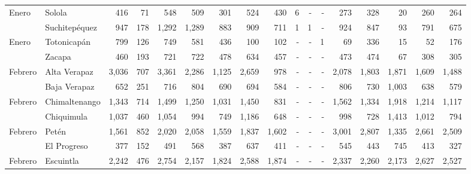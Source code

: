\begin{landscape}
\begin{center}
\begin{longtable}{llrrrrrrrrrrrrrrr}
			\multicolumn{1}{l}{	\footnotesize	 Enero 	}&	 Solola 	&	 416 	&	 71 	&	 548 	&	 509 	&	 301 	&	 524 	&	 430 	&	 6 	&	 -   	&	 -   	&	 273 	&	 328 	&	 20 	&	 260 	&	 264 	\\
			\rowcolor{color1!5!white}\multicolumn{1}{l}{	\footnotesize	 Enero 	}&	 Suchitepéquez 	&	 947 	&	 178 	&	 1,292 	&	 1,289 	&	 883 	&	 909 	&	 711 	&	 1 	&	 1 	&	 -   	&	 924 	&	 847 	&	 93 	&	 791 	&	 675 	\\
			\multicolumn{1}{l}{	\footnotesize	 Enero 	}&	 Totonicapán 	&	 799 	&	 126 	&	 749 	&	 581 	&	 436 	&	 100 	&	 102 	&	 -   	&	 -   	&	 1 	&	 69 	&	 336 	&	 15 	&	 52 	&	 176 	\\
			\rowcolor{color1!5!white}\multicolumn{1}{l}{	\footnotesize	 Enero 	}&	 Zacapa 	&	 460 	&	 193 	&	 721 	&	 722 	&	 478 	&	 634 	&	 457 	&	 -   	&	 -   	&	 -   	&	 473 	&	 474 	&	 67 	&	 308 	&	 305 	\\
			\multicolumn{1}{l}{	\footnotesize	 Febrero 	}&	 Alta Verapaz 	&	 3,036 	&	 707 	&	 3,361 	&	 2,286 	&	 1,125 	&	 2,659 	&	 978 	&	 -   	&	 -   	&	 -   	&	 2,078 	&	 1,803 	&	 1,871 	&	 1,609 	&	 1,488 	\\
			\rowcolor{color1!5!white}\multicolumn{1}{l}{	\footnotesize	 Febrero 	}&	 Baja Verapaz 	&	 652 	&	 251 	&	 716 	&	 804 	&	 690 	&	 694 	&	 584 	&	 -   	&	 -   	&	 -   	&	 806 	&	 730 	&	 1,003 	&	 638 	&	 579 	\\
			\multicolumn{1}{l}{	\footnotesize	 Febrero 	}&	 Chimaltenango 	&	 1,343 	&	 714 	&	 1,499 	&	 1,250 	&	 1,031 	&	 1,450 	&	 831 	&	 -   	&	 -   	&	 -   	&	 1,562 	&	 1,334 	&	 1,918 	&	 1,214 	&	 1,117 	\\
			\rowcolor{color1!5!white}\multicolumn{1}{l}{	\footnotesize	 Febrero 	}&	 Chiquimula 	&	 1,037 	&	 460 	&	 1,054 	&	 994 	&	 749 	&	 1,186 	&	 648 	&	 -   	&	 -   	&	 -   	&	 998 	&	 728 	&	 1,413 	&	 1,012 	&	 794 	\\
			\multicolumn{1}{l}{	\footnotesize	 Febrero 	}&	 Petén 	&	 1,561 	&	 852 	&	 2,020 	&	 2,058 	&	 1,559 	&	 1,837 	&	 1,602 	&	 -   	&	 -   	&	 -   	&	 3,001 	&	 2,807 	&	 1,335 	&	 2,661 	&	 2,509 	\\
			\rowcolor{color1!5!white}\multicolumn{1}{l}{	\footnotesize	 Febrero 	}&	 El Progreso 	&	 377 	&	 152 	&	 491 	&	 568 	&	 387 	&	 637 	&	 411 	&	 -   	&	 -   	&	 -   	&	 545 	&	 443 	&	 745 	&	 413 	&	 327 	\\
			\multicolumn{1}{l}{	\footnotesize	 Febrero 	}&	 Escuintla 	&	 2,242 	&	 476 	&	 2,754 	&	 2,157 	&	 1,824 	&	 2,588 	&	 1,874 	&	 -   	&	 -   	&	 -   	&	 2,337 	&	 2,260 	&	 2,173 	&	 2,627 	&	 2,527 	\\

\end{longtable}
\end{center}
\end{landscape}

